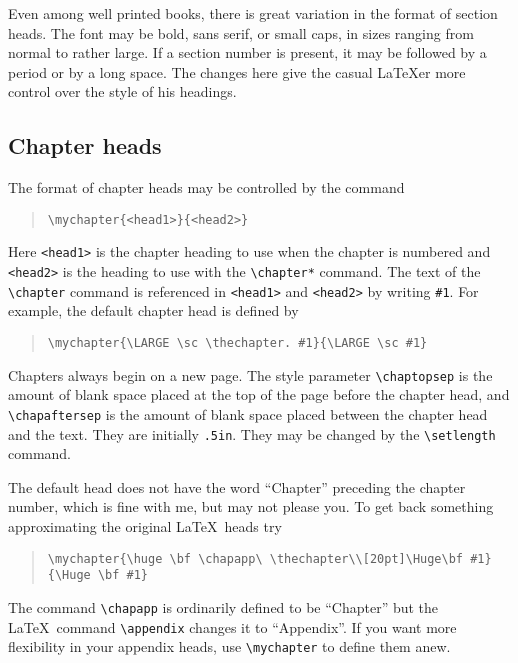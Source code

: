 Even among well printed books, there is great variation in the format
of section heads.  The font may be bold, sans serif, or small caps,
in sizes ranging from normal to rather large.  If a section number is
present, it may be followed by a period or by a long space.  The
changes here give the casual \LaTeX er more control over the style of
his headings.

\subsection{Chapter heads}

The format of chapter heads may be controlled by the command
\begin{quote}
\begin{verbatim}
\mychapter{<head1>}{<head2>}
\end{verbatim}
\end{quote}
Here \verb|<head1>| is the chapter heading to use when the chapter is
numbered and \verb|<head2>| is the heading to use with the
\verb|\chapter*| command.  The text of the \verb|\chapter| command is
referenced in \verb|<head1>| and \verb|<head2>| by writing \verb|#1|.
For example, the default chapter head is defined by
\begin{quote}
\begin{verbatim}
\mychapter{\LARGE \sc \thechapter. #1}{\LARGE \sc #1}
\end{verbatim}
\end{quote}

Chapters always begin on a new page.  The style parameter
\verb|\chaptopsep| is the amount of blank space placed at the top of
the page before the chapter head, and \verb|\chapaftersep| is
the amount of blank space placed between the chapter head and
the text.  They are initially \verb|.5in|.  They may be changed
by the \verb|\setlength| command.

The default head does not have the word ``Chapter'' preceding
the chapter number, which is fine with me, but may not please you.
To get back something approximating the original \LaTeX\ heads
try
\begin{quote}
\begin{verbatim}
\mychapter{\huge \bf \chapapp\ \thechapter\\[20pt]\Huge\bf #1}
{\Huge \bf #1}
\end{verbatim}
\end{quote}
The command \verb|\chapapp| is ordinarily defined to be
``Chapter'' but the \LaTeX\ command \verb|\appendix| changes it
to ``Appendix''.  If you want more flexibility in your appendix
heads, use \verb|\mychapter| to define them anew.


